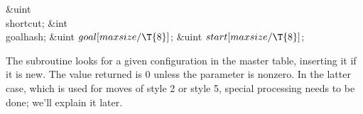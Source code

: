 \&{uint} \\{shortcut};\6
\&{int} \\{goalhash};\6
\&{uint} ${}\\{goal}[\\{maxsize}/\T{8}]{}$;\6
\&{uint} ${}\\{start}[\\{maxsize}/\T{8}]{}$;\par
\fi

The  subroutine looks for a given  configuration in the
master table, inserting it if it is new.
The value returned is 0 unless the  parameter is nonzero.
In the latter case, which is used for moves of style 2 or style 5,
special processing needs to be done; we'll explain it later.

